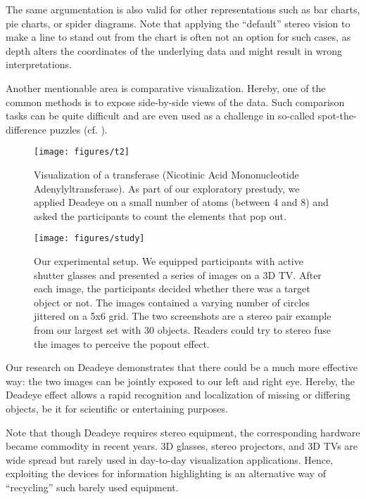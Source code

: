 \documentclass[journal]{vgtc}                %
\begin{document}
The same argumentation is also valid for other representations such as bar charts, pie charts, or spider diagrams. Note that applying the ``default'' stereo vision to make a line to stand out from the chart is often not an option for such cases, as depth alters the coordinates of the underlying data and might result in wrong interpretations.

Another mentionable area is comparative visualization. Hereby, one of the common methods is to expose side-by-side views of the data. Such comparison tasks can be quite difficult and are even used as a challenge in so-called spot-the-difference puzzles (cf. ). 



\begin{figure}[t!]
\centering
\texttt{[image: figures/t2]}
\caption{Visualization of a transferase (Nicotinic Acid Mononucleotide Adenylyltransferase). As part of our exploratory prestudy, we applied Deadeye on a small number of atoms (between 4 and 8) and asked the participants to count the elements that pop out.}
\label{fig:atoms}
\end{figure}


\begin{figure*}[t!]
\centering
\texttt{[image: figures/study]}
\caption{Our experimental setup. We equipped participants with active shutter glasses and presented a series of images on a 3D TV. After each image, the participants decided whether there was a target object or not. The images contained a varying number of circles jittered on a 5x6 grid. The two screenshots are a stereo pair example from our largest set with 30 objects. Readers could try to stereo fuse the images to perceive the popout effect.}
\label{fig:study}
\end{figure*}

Our research on Deadeye demonstrates that there could be a much more effective way: the two images can be jointly exposed to our left and right eye. Hereby, the Deadeye effect allows a rapid recognition and localization of missing or differing objects, be it for scientific or entertaining purposes.

Note that though Deadeye requires stereo equipment, the corresponding hardware became commodity in recent years. 3D glasses, stereo projectors, and 3D TVs are wide spread but rarely used in day-to-day visualization applications. Hence, exploiting the devices for information highlighting is an alternative way of ``recycling'' such barely used equipment. 
\end{document}
